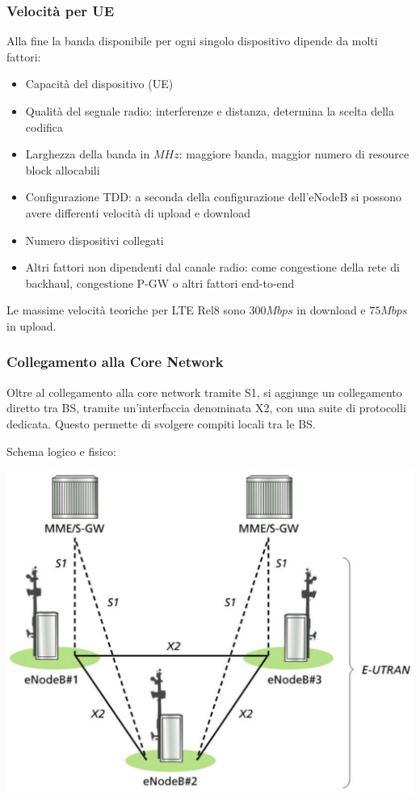 \subsubsection{Velocità per UE}

Alla fine la banda disponibile per ogni singolo dispositivo dipende da molti fattori: 
\begin{itemize}
	\item Capacità del dispositivo (UE)

	\item Qualità del segnale radio: interferenze e distanza, determina la scelta della codifica

	\item Larghezza della banda in $MHz$: maggiore banda, maggior numero di resource block allocabili

	\item Configurazione TDD: a seconda della configurazione dell'eNodeB si possono avere differenti velocità di upload e download

	\item Numero dispositivi collegati

	\item Altri fattori non dipendenti dal canale radio: come congestione della rete di backhaul, congestione P-GW o altri fattori end-to-end
\end{itemize}

Le massime velocità teoriche per LTE Rel8 sono $300Mbps$ in download e $75Mbps$ in upload.


\subsubsection{Collegamento alla Core Network}

Oltre al collegamento alla core network tramite S1, si aggiunge un collegamento diretto tra BS, tramite un'interfaccia denominata X2, con una suite di protocolli dedicata. Questo permette di svolgere compiti locali tra le BS.

Schema logico e fisico:
\begin{center}
	\includegraphics[width=0.6\linewidth]{img/4g/x21}
\end{center}

